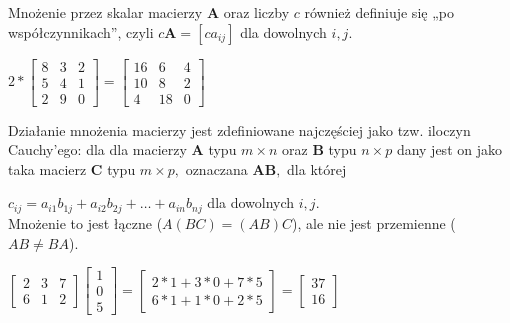 \documentclass[a4paper,12pt,oneside]{book}
\begin{document}
			Mnożenie przez skalar macierzy $\mathbf{A}$ oraz liczby $c$ również definiuje się „po współczynnikach”, czyli $c\mathbf {A} =[ca_{ij}]$ dla dowolnych $ i,j.$\\
			\begin{center}
				$ 2 * \begin{bmatrix}
					8 & 3 & 2 \\
					5 & 4 & 1 \\
					2 & 9 & 0 
				\end{bmatrix} = 
			\begin{bmatrix}
				16 & 6 & 4 \\
				10 & 8 & 2 \\
				4 & 18 & 0 
			\end{bmatrix}$
			\end{center}
		
			Działanie mnożenia macierzy jest zdefiniowane najczęściej jako tzw. iloczyn Cauchy'ego: dla dla macierzy ${\mathbf  A}$ typu $m\times n$ oraz $\mathbf{B}$ typu $n \times p$ dany jest on jako taka macierz $\mathbf C$ typu $m\times p,$ oznaczana $\mathbf {AB} ,$ dla której
			
			$c_{ij}=a_{i1}b_{1j}+a_{i2}b_{2j}+\dots +a_{in}b_{nj}$ dla dowolnych $i,j.$\\
			
			Mnożenie to jest łączne ($A(BC)=(AB)C$), ale nie jest przemienne ($AB \neq BA$).\\
			
				\begin{center}
				$\begin{bmatrix}
					2 & 3 & 7 \\
					6 & 1 & 2 
				\end{bmatrix} 
				\begin{bmatrix}
					1 \\
					0\\
					5 
				\end{bmatrix} = 
				\begin{bmatrix}
				2 * 1 + 3 * 0 + 7 * 5\\
				6 * 1 + 1 * 0 + 2 * 5
			\end{bmatrix}=
			\begin{bmatrix}
				37\\
				16
			\end{bmatrix}$
			\end{center}
			
			
			
\end{document}
